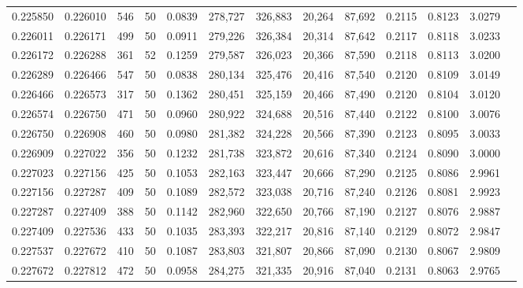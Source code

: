 \begin{tabular}{rrrrrrrrrrrrr}
0.225850 & 0.226010 &   546 &  50 &                                     0.0839 & 278,727 & 326,883 &  20,264 &  87,692 & 0.2115 & 0.8123 & 3.0279 \\
0.226011 & 0.226171 &   499 &  50 &                                     0.0911 & 279,226 & 326,384 &  20,314 &  87,642 & 0.2117 & 0.8118 & 3.0233 \\
0.226172 & 0.226288 &   361 &  52 &                                     0.1259 & 279,587 & 326,023 &  20,366 &  87,590 & 0.2118 & 0.8113 & 3.0200 \\
0.226289 & 0.226466 &   547 &  50 &                                     0.0838 & 280,134 & 325,476 &  20,416 &  87,540 & 0.2120 & 0.8109 & 3.0149 \\
0.226466 & 0.226573 &   317 &  50 &                                     0.1362 & 280,451 & 325,159 &  20,466 &  87,490 & 0.2120 & 0.8104 & 3.0120 \\
0.226574 & 0.226750 &   471 &  50 &                                     0.0960 & 280,922 & 324,688 &  20,516 &  87,440 & 0.2122 & 0.8100 & 3.0076 \\
0.226750 & 0.226908 &   460 &  50 &                                     0.0980 & 281,382 & 324,228 &  20,566 &  87,390 & 0.2123 & 0.8095 & 3.0033 \\
0.226909 & 0.227022 &   356 &  50 &                                     0.1232 & 281,738 & 323,872 &  20,616 &  87,340 & 0.2124 & 0.8090 & 3.0000 \\
0.227023 & 0.227156 &   425 &  50 &                                     0.1053 & 282,163 & 323,447 &  20,666 &  87,290 & 0.2125 & 0.8086 & 2.9961 \\
0.227156 & 0.227287 &   409 &  50 &                                     0.1089 & 282,572 & 323,038 &  20,716 &  87,240 & 0.2126 & 0.8081 & 2.9923 \\
0.227287 & 0.227409 &   388 &  50 &                                     0.1142 & 282,960 & 322,650 &  20,766 &  87,190 & 0.2127 & 0.8076 & 2.9887 \\
0.227409 & 0.227536 &   433 &  50 &                                     0.1035 & 283,393 & 322,217 &  20,816 &  87,140 & 0.2129 & 0.8072 & 2.9847 \\
0.227537 & 0.227672 &   410 &  50 &                                     0.1087 & 283,803 & 321,807 &  20,866 &  87,090 & 0.2130 & 0.8067 & 2.9809 \\
0.227672 & 0.227812 &   472 &  50 &                                     0.0958 & 284,275 & 321,335 &  20,916 &  87,040 & 0.2131 & 0.8063 & 2.9765 \\

\end{tabular}
